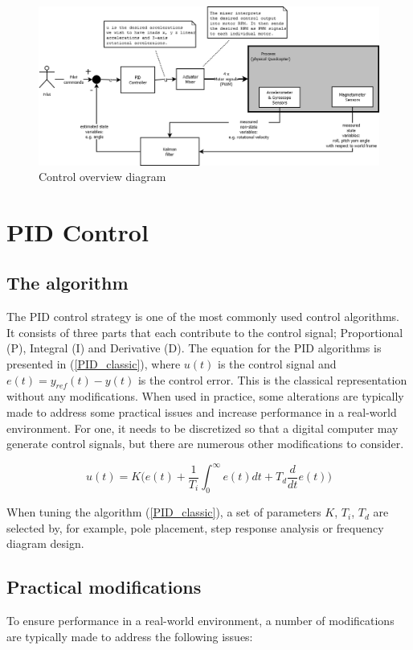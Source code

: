 \documentclass[a4paper]{report}
\begin{document}
\begin{figure}[h]
    \centering
    \includegraphics[scale=0.3]{images/ControlDiagram.png}
    \caption{Control overview diagram}
    \label{fig:controloverview}
\end{figure}

	\section{PID Control}

		\subsection{The algorithm}
The PID control strategy is one of the most commonly used control algorithms. It consists of three parts that each contribute to the control signal; Proportional (P), Integral (I) and Derivative (D). The equation for the PID algorithms is presented in (\ref{PID_classic}), where $u(t)$ is the control signal and $e(t) = y_{ref}(t) - y(t)$ is the control error. This is the classical representation without any modifications. When used in practice, some alterations are typically made to address some practical issues and increase performance in a real-world environment. For one, it needs to be discretized so that a digital computer may generate control signals, but there are numerous other modifications to consider.

\begin{equation}
u(t) = K \bigg( e(t) + \dfrac{1}{T_i} \int_{0}^{\infty}  e(t) dt + T_d \dfrac{d}{dt} e(t) \bigg)
\label{PID_classic}
\end{equation}

When tuning the algorithm (\ref{PID_classic}), a set of parameters $K$, $T_i$, $T_d$ are selected by, for example, pole placement, step response analysis or frequency diagram design.

	\subsection{Practical modifications}
To ensure performance in a real-world environment, a number of modifications are typically made to address the following issues:
\end{document}
